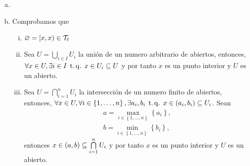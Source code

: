 \begin{eje}
    \begin{enumerate}[(a)]
        \item[]
        \item Comprobamos que
            \begin{enumerate}[i)]
                \item $\varnothing = \left[ x, x \right) \in \mathcal{T}_\ell$
                \item Sea $U = \bigcup\limits_{i \in I} U_i$ la unión de un numero arbitrario de abiertos, entonces, $\forall x \in U, \exists i \in I \operatorname{\;t.q.\;} x \in U_i \subseteq U$ y por tanto $x$ es un punto interior y $U$ es un abierto.
                \item Sea $U = \bigcap\limits_{i = 1}^n U_i$ la intersección de un numero finito de abiertos, entonces, $\forall x \in U, \forall i \in \left\{ 1, \dots, n \right\}, \exists a_i, b_i \operatorname{\;t.q.\;} x \in \left(a_i, b_i\right) \subseteq U_i$. Sean
                    \begin{gather*}
                        a = \max_{i \in \left\{ 1, \dots, n \right\}} \left\{a_i\right\}, \\
                        b = \min_{i \in \left\{ 1, \dots, n \right\}} \left\{b_i\right\},
                    \end{gather*}
                entonces $x \in \left( a, b \right) \subseteq \bigcap\limits_{i = 1}^n U_i$ y por tanto $x$ es un punto interior y $U$ es un abierto.
            \end{enumerate}
    \end{enumerate}
\end{eje}
